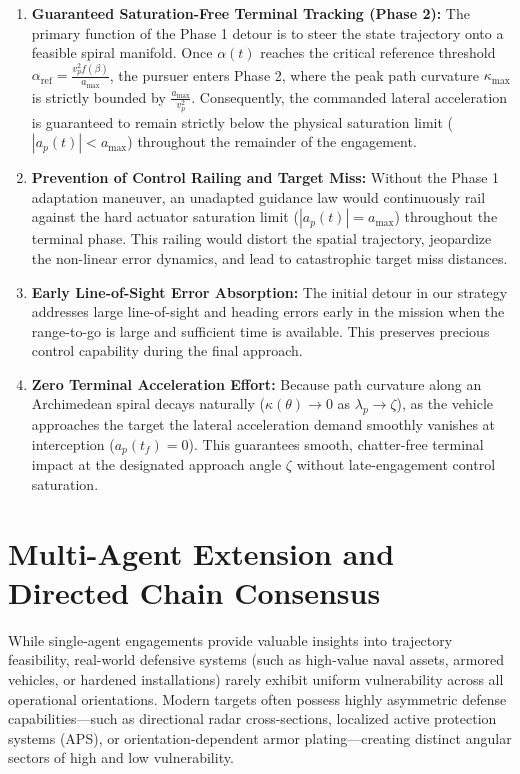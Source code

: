 \begin{enumerate}
    \item \textbf{Guaranteed Saturation-Free Terminal Tracking (Phase 2):} The primary function of the Phase 1 detour is to steer the state trajectory onto a feasible spiral manifold. Once $\alpha(t)$ reaches the critical reference threshold $\alpha_{\text{ref}} = \frac{v_p^2 f(\beta)}{a_{\text{max}}}$, the pursuer enters Phase 2, where the peak path curvature $\kappa_{\text{max}}$ is strictly bounded by $\frac{a_{\text{max}}}{v_p^2}$. Consequently, the commanded lateral acceleration is guaranteed to remain strictly below the physical saturation limit ($|a_p(t)| < a_{\text{max}}$) throughout the remainder of the engagement.
    
    \item \textbf{Prevention of Control Railing and Target Miss:} Without the Phase 1 adaptation maneuver, an unadapted guidance law would continuously rail against the hard actuator saturation limit ($|a_p(t)| = a_{\text{max}}$) throughout the terminal phase. This railing would distort the spatial trajectory, jeopardize the non-linear error dynamics, and lead to catastrophic target miss distances.
    
    \item \textbf{Early Line-of-Sight Error Absorption:} The initial detour in our strategy addresses large line-of-sight and heading errors early in the mission when the range-to-go is large and sufficient time is available. This preserves precious control capability during the final approach.
    
    \item \textbf{Zero Terminal Acceleration Effort:} Because path curvature along an Archimedean spiral decays naturally ($\kappa(\theta) \to 0$ as $\lambda_p \to \zeta$), as the vehicle approaches the target the lateral acceleration demand smoothly vanishes at interception ($a_p(t_f) = 0$). This guarantees smooth, chatter-free terminal impact at the designated approach angle $\zeta$ without late-engagement control saturation.
\end{enumerate}
\section{Multi-Agent Extension and Directed Chain Consensus}\label{sec:ch_sp_multi_agent}
While single-agent engagements provide valuable insights into trajectory feasibility, real-world defensive systems (such as high-value naval assets, armored vehicles, or hardened installations) rarely exhibit uniform vulnerability across all operational orientations. Modern targets often possess highly asymmetric defense capabilities—such as directional radar cross-sections, localized active protection systems (APS), or orientation-dependent armor plating—creating distinct angular sectors of high and low vulnerability.

